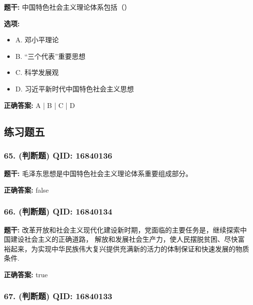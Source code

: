 \documentclass[12pt,UTF8]{ctexart}
\begin{document}
\textbf{题干:}
中国特色社会主义理论体系包括（）

\textbf{选项:}
\begin{itemize}[leftmargin=*]

  \item A. 邓小平理论

  \item B. “三个代表”重要思想

  \item C. 科学发展观

  \item D. 习近平新时代中国特色社会主义思想

\end{itemize}

\textbf{正确答案:}
A | B | C | D

\vspace{0.3em}\hrulefill\vspace{0.7em}

\subsection*{练习题五}

\subsubsection*{65. (判断题) \small QID: 16840136}

\textbf{题干:}
毛泽东思想是中国特色社会主义理论体系重要组成部分。

\textbf{正确答案:}
false

\vspace{0.3em}\hrulefill\vspace{0.7em}

\subsubsection*{66. (判断题) \small QID: 16840134}

\textbf{题干:}
改革开放和社会主义现代化建设新时期，党面临的主要任务是，继续探索中国建设社会主义的正确道路， 解放和发展社会生产力，使人民摆脱贫困、尽快富裕起来，为实现中华民族伟大复兴提供充满新的活力的体制保证和快速发展的物质条件.

\textbf{正确答案:}
true

\vspace{0.3em}\hrulefill\vspace{0.7em}

\subsubsection*{67. (判断题) \small QID: 16840133}
\end{document}
